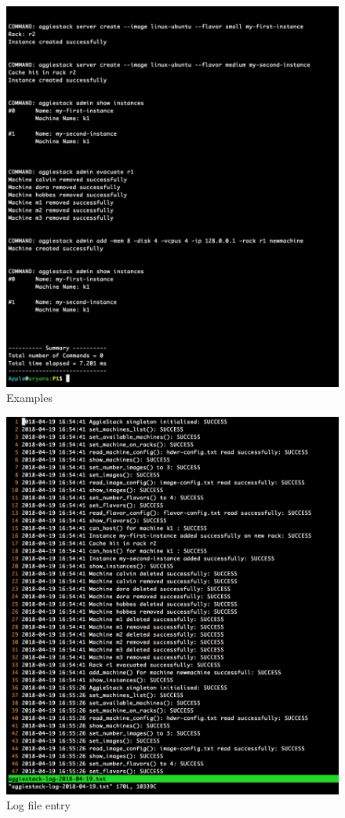 \documentclass[letterpaper]{article}
\begin{document}
\begin{figure}
	\centering
	\includegraphics[width=1\textwidth]{w1.png}
	\caption{\label{fig:data}Examples}
\end{figure}

\begin{figure}
	\centering
	\includegraphics[width=1\textwidth]{log.png}
	\caption{\label{fig:data}Log file entry}
\end{figure}
\end{document}
